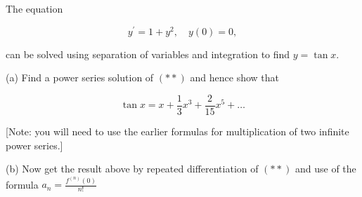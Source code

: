 \documentclass[10pt, a4paper]{article}
\begin{document}
\newpage
\begin{Problem}
    The equation

    $$
    y^{\prime}=1+y^{2}, \quad y(0)=0,
    $$
    
    can be solved using separation of variables and integration to find $y=\tan x$.
    
    (a) Find a power series solution of $(* *)$ and hence show that
    
    $$
    \tan x=x+\frac{1}{3} x^{3}+\frac{2}{15} x^{5}+\ldots
    $$
    
    [Note: you will need to use the earlier formulas for multiplication of two infinite power series.]
    
    (b) Now get the result above by repeated differentiation of $(* *)$ and use of the formula $a_{n}=\frac{f^{(n)}(0)}{n !}$
\end{Problem}
\end{document}
